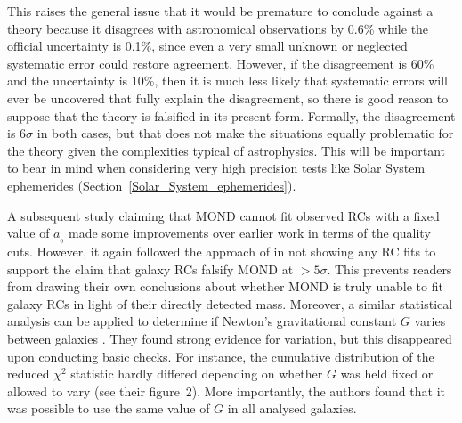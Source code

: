 \documentclass[fleqn,usenatbib,useAMS]{mnras} %
\begin{document}
This raises the general issue that it would be premature to conclude against a theory because it disagrees with astronomical observations by 0.6\% while the official uncertainty is 0.1\%, since even a very small unknown or neglected systematic error could restore agreement. However, if the disagreement is 60\% and the uncertainty is 10\%, then it is much less likely that systematic errors will ever be uncovered that fully explain the disagreement, so there is good reason to suppose that the theory is falsified in its present form. Formally, the disagreement is $6\sigma$ in both cases, but that does not make the situations equally problematic for the theory given the complexities typical of astrophysics. This will be important to bear in mind when considering very high precision tests like Solar System ephemerides (Section~\ref{Solar_System_ephemerides}).

A subsequent study claiming that MOND cannot fit observed RCs with a fixed value of $a_{_0}$ \citep{Marra_2020} made some improvements over earlier work in terms of the quality cuts. However, it again followed the approach of \citet{Rodrigues_2018} in not showing any RC fits to support the claim that galaxy RCs falsify MOND at $>5\sigma$. This prevents readers from drawing their own conclusions about whether MOND is truly unable to fit galaxy RCs in light of their directly detected mass. Moreover, a similar statistical analysis can be applied to determine if Newton's gravitational constant $G$ varies between galaxies \citep{Pengfei_Li_2021}. They found strong evidence for variation, but this disappeared upon conducting basic checks. For instance, the cumulative distribution of the reduced $\chi^2$ statistic hardly differed depending on whether $G$ was held fixed or allowed to vary (see their figure~2). More importantly, the authors found that it was possible to use the same value of $G$ in all analysed galaxies.
\end{document}
